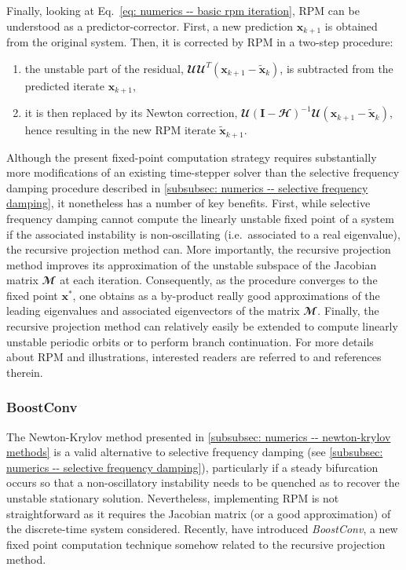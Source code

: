     Finally, looking at Eq.\ \eqref{eq: numerics -- basic rpm iteration}, RPM can be understood as a predictor-corrector. First, a new prediction $\mathbf{x}_{k+1}$ is obtained from the original system. Then, it is corrected by RPM in a two-step procedure:
    \begin{enumerate}
      \item the unstable part of the residual, $\mathbfcal{U} \mathbfcal{U}^T(\mathbf{x}_{k+1} - \tilde{\mathbf{x}}_k)$, is subtracted from the predicted iterate $\mathbf{x}_{k+1}$,

      \item it is then replaced by its Newton correction, $\mathbfcal{U} \left( \mathbf{I} - \mathbfcal{H} \right)^{-1} \mathbfcal{U} \left( \mathbf{x}_{k+1} - \tilde{\mathbf{x}}_k \right)$, hence resulting in the new RPM iterate $\tilde{\mathbf{x}}_{k+1}$.
    \end{enumerate}
    Although the present fixed-point computation strategy requires substantially more modifications of an existing time-stepper solver than the selective frequency damping procedure described in \textsection \ref{subsubsec: numerics -- selective frequency damping}, it nonetheless has a number of key benefits. First, while selective frequency damping cannot compute the linearly unstable fixed point of a system if the associated instability is non-oscillating (i.e.\ associated to a real eigenvalue), the recursive projection method can. More importantly, the recursive projection method improves its approximation of the unstable subspace of the Jacobian matrix $\mathbfcal{M}$ at each iteration. Consequently, as the procedure converges to the fixed point $\mathbf{x}^*$, one obtains as a by-product really good approximations of the leading eigenvalues and associated eigenvectors of the matrix $\mathbfcal{M}$. Finally, the recursive projection method can relatively easily be extended to compute linearly unstable periodic orbits or to perform branch continuation. For more details about RPM and illustrations, interested readers are referred to \cite{siam:shroff:1993, appmaths:janovsky:2003, aiaa:campobasso:2004, jcp:renac:2011} and references therein.


    \subsubsection{BoostConv}
    \label{subsubsec: numerics -- BoostConv}

    The Newton-Krylov method presented in \textsection \ref{subsubsec: numerics -- newton-krylov methods} is a valid alternative to selective frequency damping (see \textsection \ref{subsubsec: numerics -- selective frequency damping}), particularly if a steady bifurcation occurs so that a non-oscillatory instability needs to be quenched as to recover the unstable stationary solution. Nevertheless, implementing RPM is not straightforward as it requires the Jacobian matrix (or a good approximation) of the discrete-time system considered. Recently, \cite{citro2017efficient} have introduced \emph{BoostConv}, a new fixed point computation technique somehow related to the recursive projection method.

